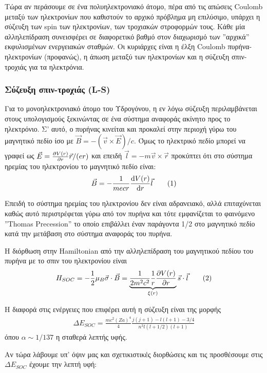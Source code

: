 \documentclass[a4paper]{article}
\newcommand\numberthis{\addtocounter{equation}{1}\tag{\theequation}}
\begin{document}
		Τώρα αν περάσουμε σε ένα πολυηλεκτρονιακό άτομο, πέρα από τις απώσεις Coulomb μεταξύ των ηλεκτρονίων που καθιστούν το αρχικό πρόβλημα μη επιλύσιμο, υπάρχει η σύζευξη των spin των ηλεκτρονίων, των τροχιακών στροφορμών τους. Κάθε μία αλληλεπίδραση συνεισφέρει σε διαφορετικό βαθμό στον διαχωρισμό των ''αρχικά'' εκφυλισμένων ενεργειακών σταθμών. Οι κυριάρχες είναι η έλξη Coulomb πυρήνα-ηλεκτρονίων (προφανώς), η άπωση μεταξύ των ηλεκτρονίων και η σύζευξη σπιν-τροχιάς για τα ηλεκτρόνια.
		
		\subsubsection*{Σύζευξη σπιν-τροχιάς (L-S)}
		Για το μονοηλεκτρονιακό άτομο του Υδρογόνου, η εν λόγω σύζευξη περιλαμβάνεται στους υπολογισμούς ξεκινώντας σε ένα σύστημα αναφοράς ακίνητο προς το ηλεκτρόνιο. Σ' αυτό, ο πυρήνας κινείται και προκαλεί στην περιοχή γύρω του μαγνητικό πεδίο ίσο με $\vec{B} = - (\vec{v}\times\vec{E})/c$. Όμως το ηλεκτρικό πεδίο μπορεί να γραφεί ως $\vec{E} = \pdv{V(r)}{r} \vec{r} /(er)$ και επειδή $\vec{l}=-m\vec{v}\times\vec{r}$ προκύπτει ότι στο σύστημα ηρεμίας του ηλεκτρονίου το μαγνητικό πεδίο είναι: 
		\begin{align*}\label{1}
			\vec{B} = - \frac{1}{mecr}\odv{V(r)}{r}\vec{l} \numberthis			
		\end{align*}

Επειδή το σύστημα ηρεμίας του ηλεκτρονίου δεν είναι αδρανειακό, αλλά επιταχύνεται καθώς αυτό περιστρέφεται γύρω από τον πυρήνα και τότε εμφανίζεται το φαινόμενο ''Thomas Precession'' το οποίο επιβάλλει έναν παράγοντα 1/2 στο μαγνητικό πεδίο κατά την μετάβαση στο σύστημα αναφοράς του πυρήνα.

Η διόρθωση στην Hamiltonian από την αλληλεπίδραση του μαγνητικού πεδίου του πυρήνα με το σπιν του ηλεκτρονίου είναι 
	\begin{align*}\label{2}
		H_{SOC}=-\frac{1}{2}\mu_B\vec{\sigma}\cdot\vec{B} = \underbrace{\frac{1 }{2m^2c^2}\frac{1}{r} \pdv{V(r)}{r} }_{\xi(r)}\vec{s}\cdot\vec{l} \numberthis
	\end{align*}			

Η διαφορά στις ενέργειες που επιφέρει αυτή η σύζευξη είναι της μορφής 
	\begin{align*}
		\Delta E_{SOC}= \frac{mc^2(Za)^4}{4}\frac{j(j+1)-l(l+1)-3/4}{n^3l(l+1/2)(l+1)} 
	\end{align*}
	όπου $\alpha \sim 1/137$ η σταθερά λεπτής υφής.
	
Αν τώρα λάβουμε υπ' όψιν μας και σχετικιστικές διορθώσεις και τις προσθέσουμε στις $\Delta E_{SOC}$ έχουμε την λεπτή υφή:
\end{document}
